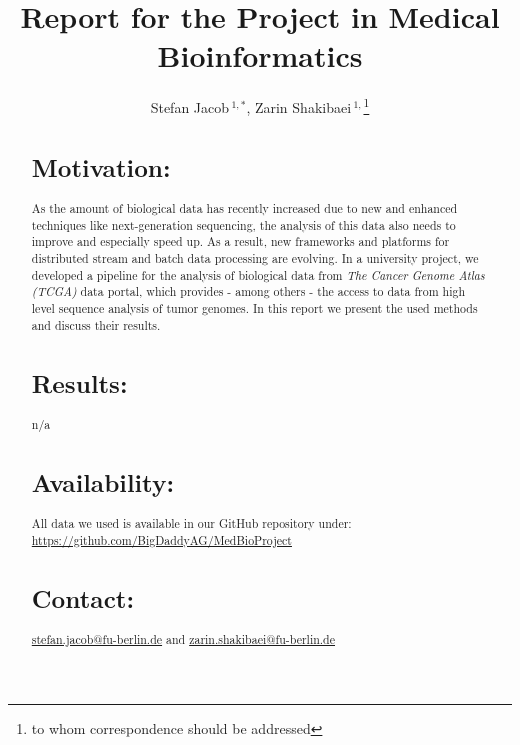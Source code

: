 \documentclass{bioinfo}
\begin{document}

\title[MedBioProject]{Report for the Project in Medical Bioinformatics}
\author[Jacob, Shakibaei]{Stefan Jacob\,$^{1,*}$, Zarin Shakibaei\,$^{1,}$\footnote{to whom correspondence should be addressed}}
\address{$^{\text{\sf 1}}$BigDaddyAG, Fachbereich Mathematik und Informatik, Freie Universit\"at Berlin, Takustra\ss{}e 9, 14195 Berlin, Germany}



\maketitle

\begin{abstract}

\section{Motivation:}
As the amount of biological data has recently increased due to new and enhanced techniques like next-generation sequencing, the analysis of this data also needs to improve and especially speed up. As a result, new frameworks and platforms for distributed stream and batch data processing are evolving. In a university project, we developed a pipeline for the analysis of biological data from \emph{The Cancer Genome Atlas (TCGA)} data portal, which provides - among others - the access to data from high level sequence analysis of tumor genomes. In this report we present the used methods and discuss their results.

\section{Results:}
n/a

\section{Availability:}
All data we used is available in our GitHub repository under: \href{https://github.com/BigDaddyAG/MedBioProject}{https://github.com/BigDaddyAG/MedBioProject}

\section{Contact:}
\href{stefan.jacob@fu-berlin.de}{stefan.jacob@fu-berlin.de} and \href{zarin.shakibaei@fu-berlin.de}{zarin.shakibaei@fu-berlin.de}
\end{abstract}
\end{document}
